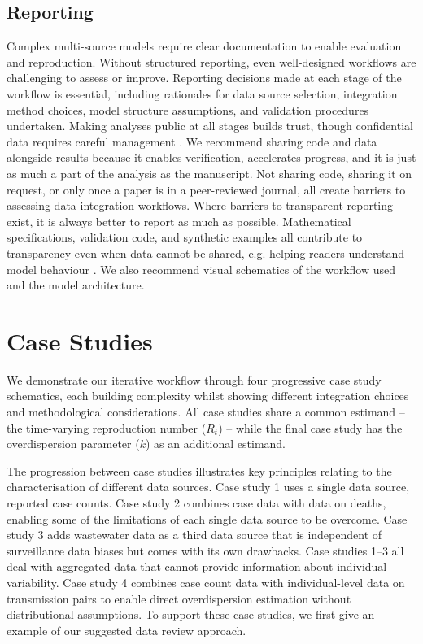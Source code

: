 \documentclass{article}
\begin{document}
\subsection{Reporting} \label{sec:reporting}
Complex multi-source models require clear documentation to enable evaluation and reproduction.
Without structured reporting, even well-designed workflows are challenging to assess or improve.
Reporting decisions made at each stage of the workflow is essential, including rationales for data source selection, integration method choices, model structure assumptions, and validation procedures undertaken.
Making analyses public at all stages builds trust, though confidential data requires careful management \citep{Abbott2021-delta, Abbott2022-prevalence}. 
We recommend sharing code and data alongside results because it enables verification, accelerates progress, and it is just as much a part of the analysis as the manuscript.
Not sharing code, sharing it on request, or only once a paper is in a peer-reviewed journal, all create barriers to assessing data integration workflows.
Where barriers to transparent reporting exist, it is always better to report as much as possible.
Mathematical specifications, validation code, and synthetic examples all contribute to transparency even when data cannot be shared, e.g. helping readers understand model behaviour \citep{Mellor2025-norovirus}.
We also recommend visual schematics of the workflow used and the model architecture.

\section{Case Studies}

We demonstrate our iterative workflow through four progressive case study schematics, each building complexity whilst showing different integration choices and methodological considerations.
All case studies share a common estimand -- the time-varying reproduction number ($R_t$) -- while the final case study has the overdispersion parameter ($k$) as an additional estimand.

The progression between case studies illustrates key principles relating to the characterisation of different data sources. Case study 1 uses a single data source, reported case counts. Case study 2 combines case data with data on deaths, enabling some of the limitations of each single data source to be overcome. Case study 3 adds wastewater data as a third data source that is independent of surveillance data biases but comes with its own drawbacks. Case studies 1--3 all deal with aggregated data that cannot provide information about individual variability. Case study 4 combines case count data with individual-level data on transmission pairs to enable direct overdispersion estimation without distributional assumptions.
To support these case studies, we first give an example of our suggested data review approach.
\end{document}
